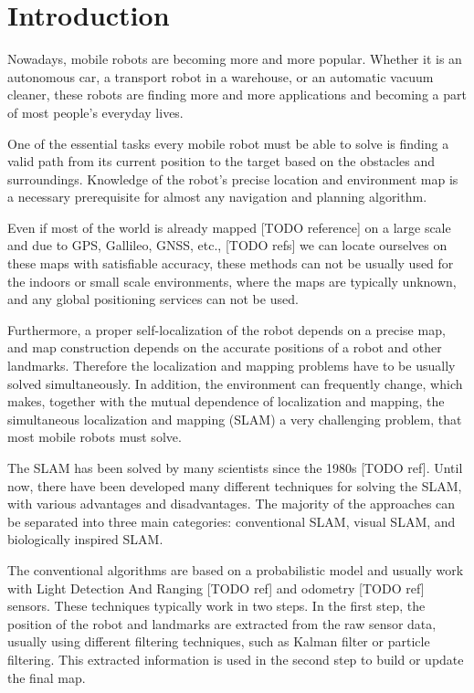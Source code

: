 \chapter{Introduction}\label{chapter:introduction}

Nowadays, mobile robots are becoming more and more popular. Whether it is an autonomous car, a transport robot in a warehouse, or an automatic vacuum cleaner, these robots are finding more and more applications and becoming a part of most people's everyday lives.\par
One of the essential tasks every mobile robot must be able to solve is finding a valid path from its current position to the target based on the obstacles and surroundings. Knowledge of the robot's precise location and environment map is a necessary prerequisite for almost any navigation and planning algorithm.\par
Even if most of the world is already mapped [TODO reference] on a large scale and due to GPS, Gallileo, GNSS, etc., [TODO refs] we can locate ourselves on these maps with satisfiable accuracy, these methods can not be usually used for the indoors or small scale environments, where the maps are typically unknown, and any global positioning services can not be used.\par
Furthermore, a proper self-localization of the robot depends on a precise map, and map construction depends on the accurate positions of a robot and other landmarks. Therefore the localization and mapping problems have to be usually solved simultaneously. In addition, the environment can frequently change, which makes, together with the mutual dependence of localization and mapping, the simultaneous localization and mapping (SLAM) a very challenging problem, that most mobile robots must solve.\par
The SLAM has been solved by many scientists since the 1980s [TODO ref]. Until now, there have been developed many different techniques for solving the SLAM, with various advantages and disadvantages. The majority of the approaches can be separated into three main categories: conventional SLAM, visual SLAM, and biologically inspired SLAM.\par
The conventional algorithms are based on a probabilistic model and usually work with Light Detection And Ranging [TODO ref] and odometry [TODO ref] sensors. These techniques typically work in two steps. In the first step, the position of the robot and landmarks are extracted from the raw sensor data, usually using different filtering techniques, such as Kalman filter or particle filtering. This extracted information is used in the second step to build or update the final map.\par
